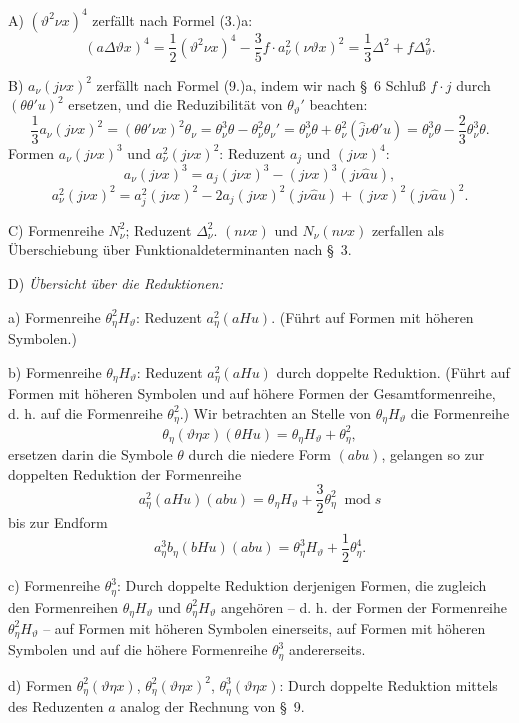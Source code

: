 \documentclass[11pt]{article}
\newcommand{\A}{\Delta}
\newcommand{\modu}[1]{\;\operatorname{mod} #1}
\begin{document}
\noindent A) $(\vartheta^2\nu x)^4$ zerfällt nach Formel (3.)a:
\[
(a\A\vartheta x)^4=\frac12(\vartheta^2\nu x)^4-\frac35 f\cdot a_\nu^2(\nu\vartheta x)^2
=\frac13\A^2+f\A_\vartheta^2.
\]

\noindent B) $a_\nu(j\nu x)^2$ zerfällt nach Formel (9.)a, indem wir nach \S\ 6 Schluß $f\cdot j$ durch $(\theta\theta'u)^2$ ersetzen, und die Reduzibilität von $\theta_\vartheta'$ beachten:
\[
\frac13a_\nu(j\nu x)^2=(\theta\theta'\nu x)^2\theta_\nu
=\theta_\nu^3\theta-\theta_\nu^2\theta_\nu'
=\theta_\nu^3\theta+\theta_\nu^2(\widehat{j}\nu\theta'u)
=\theta_\nu^3\theta-\frac23\theta_\nu^3\theta.
\]
Formen $a_\nu(j\nu x)^3$ und $a_\nu^2(j\nu x)^2$: Reduzent $a_j$ und $(j\nu x)^4$:
\[
a_\nu(j\nu x)^3=a_j(j\nu x)^3-(j\nu x)^3(j\nu\widehat{a}u),
\]
\[
a_\nu^2(j\nu x)^2=a_j^2(j\nu x)^2-2a_j(j\nu x)^2(j\nu\widehat{a}u)+(j\nu x)^2(j\nu\widehat{a}u)^2.
\]

\noindent C) Formenreihe $N_\nu^2$; Reduzent $\A_\nu^2$. $(n\nu x)$ und $N_\nu(n\nu x)$ zerfallen als Überschiebung über Funktionaldeterminanten nach \S\ 3.

\noindent D) \emph{Übersicht über die Reduktionen:}

a) Formenreihe $\theta_\eta^2H_\vartheta$: Reduzent $a_\eta^2(aHu)$. (Führt auf Formen mit höheren Symbolen.)

b) Formenreihe $\theta_\eta H_\vartheta$: Reduzent $a_\eta^2(aHu)$ durch doppelte Reduktion. (Führt auf Formen mit höheren Symbolen und auf höhere Formen der Gesamtformenreihe, d. h. auf die Formenreihe $\theta_\eta^2$.) Wir betrachten an Stelle von $\theta_\eta H_\vartheta$ die Formenreihe
\[
\theta_\eta(\vartheta\eta x)(\theta Hu)=\theta_\eta H_\vartheta+\theta_\eta^2,
\]
ersetzen darin die Symbole $\theta$ durch die niedere Form $(abu)$, gelangen so zur doppelten Reduktion der Formenreihe
\[
a_\eta^2(aHu)(abu)=\theta_\eta H_\vartheta+\frac32\theta_\eta^2\modu{s}
\]
bis zur Endform
\[
a_\eta^3b_\eta(bHu)(abu)=\theta_\eta^3H_\vartheta+\frac12\theta_\eta^4.
\]

c) Formenreihe $\theta_\eta^3$: Durch doppelte Reduktion derjenigen Formen, die zugleich den Formenreihen $\theta_\eta H_\vartheta$ und $\theta_\eta^2H_\vartheta$ angehören -- d. h. der Formen der Formenreihe $\theta_\eta^2H_\vartheta$ -- auf Formen mit höheren Symbolen einerseits, auf Formen mit höheren Symbolen und auf die höhere Formenreihe $\theta_\eta^3$ andererseits.

d) Formen $\theta_\eta^2(\vartheta\eta x)$, $\theta_\eta^2(\vartheta\eta x)^2$, $\theta_\eta^3(\vartheta\eta x)$: Durch doppelte Reduktion mittels des Reduzenten $a$ analog der Rechnung von \S\ 9.
\end{document}
